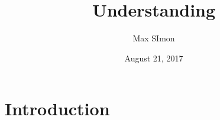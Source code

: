 \documentclass[
12pt, %
parskip=half, %
digital, %
oneside, %
]{bsc}
\title{Understanding}
\author{Max SImon}
\date{August 21, 2017}
\begin{document}
	
\chapter{Introduction}

\end{document}

